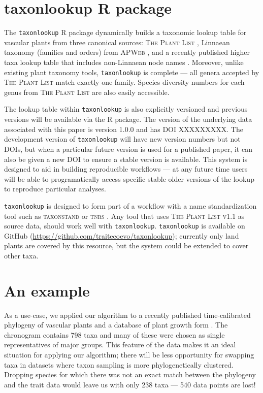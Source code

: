 \documentclass[a4paper,11pt]{article}
\newcommand{\taxonlookup}{\tt taxonlookup}
\begin{document}
\section{taxonlookup R package}

The {\taxonlookup} R package dynamically builds a taxonomic lookup table for vascular plants from three canonical sources: \textsc{The Plant List} \citep{ThePlantList}, Linnaean taxonomy (families and orders) from \textsc{APWeb} \citep{apweb}, and a recently published higher taxa lookup table that includes non-Linnaean node names \citep[][compiled by D.C. Tank, J.M. Eastman, J.M. Beaulieu, W.K. Cornwell, P.F. Stevens, and A.E. Zanne]{ZanneDryad}.  Moreover, unlike existing plant taxonomy tools, {\taxonlookup} is complete --- all genera accepted by  \textsc{The Plant List} match exactly one family.  Species diversity numbers for each genus from \textsc{The Plant List} are also easily accessible.  

The lookup table within {\taxonlookup} is also explicitly versioned and previous versions will be available via the R package.   The version of the underlying data associated with this paper is version 1.0.0 and has DOI XXXXXXXXX.   The development version of {\taxonlookup} will have new version numbers but not DOIs, but when a particular future version is used for a published paper, it can also be given a new DOI to ensure a stable version is available.  This system is designed to aid in building reproducible workflows --- at any future time users will be able to programatically access specific stable older versions of the lookup to reproduce particular analyses. 

{\taxonlookup} is designed to form part of a workflow with a name standardization tool such as \textsc{taxonstand} \citep{Cayuela2014} or \textsc{tnrs} \citep{boyle2013taxonomic}.  Any tool that uses \textsc{The Plant List  v1.1} as source data, should work well with {\taxonlookup}.   
 {\taxonlookup} is available on GitHub (\url{https://github.com/traitecoevo/taxonlookup}); currently only land plants are covered by this resource, but the system could be extended to cover other taxa. 

\section{An example}

As a use-case, we applied our algorithm to a recently published time-calibrated phylogeny of vascular plants \citep{Magallon2015} and a database of plant growth form \citep{Zanne}. The \citet{Magallon2015} chronogram contains 798 taxa and many of these were chosen as single representatives of major groups. This feature of the data makes it an ideal situation for applying our algorithm; there will be less opportunity for swapping taxa in datasets where taxon sampling is more phylogenetically clustered. Dropping species for which there was not an exact match between the phylogeny and the trait data would leave us with only 238 taxa --- 540 data points are lost!
\end{document}
